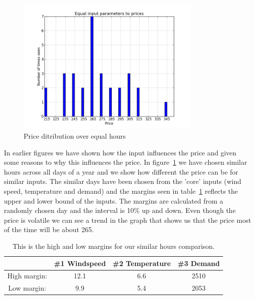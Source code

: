 \begin{figure}[H]
\centering
\includegraphics[width=0.8\textwidth ,natwidth=410,natheight=237]{billeder/energy_price_plots/same_hour_distribution.png}
\caption{Price ditribution over equal hours}
\label{fig:same_hour_distribution}
\end{figure}

In earlier figures we have shown how the input influences the price and given some reasons to why this influences the price. In figure~\ref{fig:same_hour_distribution} we have chosen similar hours across all days of a year and we show how different the price can be for similar inputs. The similar days have been chosen from the 'core' inputs (wind speed, temperature and demand) and the margins seen in table~\ref{table:similarHoursLimits} reflects the upper and lower bound of the inputs. The margins are calculated from a randomly chosen day and the interval is 10\% up and down. Even though the price is volatile we can see a trend in the graph that shows us that the price most of the time will be about 265.

\begin{table}[H]
\centering  %
\begin{tabular}{c c c c} %
 & \#1 Windspeed & \#2 Temperature & \#3 Demand \\ [0.5ex] %
\hline                  %
High margin: & 12.1 & 6.6 & 2510  \\
Low margin: & 9.9 & 5.4 & 2053 \\ [1ex] %
\hline %
\end{tabular}
\caption{This is the high and low margins for our similar hours comparison.} %
\label{table:similarHoursLimits} %
\end{table}

